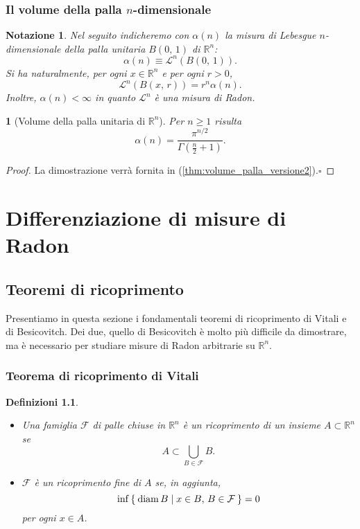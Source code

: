 \documentclass[a4paper,10pt,openright,oneside]{book}
\theoremstyle{theoremstyle}
\theoremstyle{theoremstylewoheader}
\newtheorem{teorema2}[teorema]{}
\theoremstyle{theoremstyle}
\newtheorem{definizioni}[teorema]{Definizioni}
\newtheorem{notazione}[teorema]{Notazione}
\theoremstyle{proofsecstyle}
\theoremstyle{nonumberplain}
\newtheorem{proof}{Dim.}
\newcommand{\FF}{\ensuremath{\mathcal{F}}}
\newcommand{\RR}{\ensuremath{\mathbb{R}}}
\newcommand{\Leb}{\ensuremath{\mathcal{L}}}
\DeclareMathOperator{\diam}{diam}
\renewcommand{\qedsymbol}{\ensuremath{\square}}
\newcommand{\qed}{\unskip\nobreak\hfill\nobreak\hspace{.5em}\qedsymbol}
\begin{document}
\subsection{Il volume della palla $n$-dimensionale}

\begin{notazione}
\label{not:alpha_n}
Nel seguito indicheremo con $\alpha(n)$ la misura di Lebesgue $n$-dimensionale della palla unitaria $B(0,\, 1)$ di $\RR^n$:
\[
\alpha(n) \equiv \Leb^n(B(0,\, 1)).
\]
Si ha naturalmente, per ogni $x \in \RR^n$ e per ogni $r > 0$,
\[
\Leb^n(B(x,\, r)) = r^n\alpha(n).
\]
Inoltre, $\alpha(n) < \infty$ in quanto $\Leb^n$ è una misura di Radon.
\end{notazione}

\begin{teorema2}[Volume della palla unitaria di $\RR^n$]
\label{thm:volume_palla_versione1}
Per $n \ge 1$ risulta
\[
\alpha(n) = \frac{\pi^{n/2}}{\Gamma(\frac{n}{2} + 1)}.
\]
\end{teorema2}

\begin{proof}
La dimostrazione verrà fornita in (\ref{thm:volume_palla_versione2}).\qed
\end{proof}


\chapter{Differenziazione di misure di Radon}

\section{Teoremi di ricoprimento}

Presentiamo in questa sezione i fondamentali teoremi di ricoprimento di Vitali e di Besicovitch. Dei due, quello di Besicovitch è molto più difficile da dimostrare, ma è necessario per studiare misure di Radon arbitrarie su $\RR^n$.

\subsection{Teorema di ricoprimento di Vitali}

\begin{definizioni}
\label{def:ricoprimenti}
\mbox{}
\begin{itemize}
\item[(i)] Una famiglia $\FF$ di palle chiuse in $\RR^n$ è un \emph{ricoprimento} di un insieme $A \subset \RR^n$ se
\[
A \subset \bigcup_{B \in \FF} B.
\]
\item[(ii)] $\FF$ è un \emph{ricoprimento fine} di $A$ se, in aggiunta,
\[
\inf\Set{ \diam B | x \in B,\, B \in \FF } = 0
\]
per ogni $x \in A$.
\end{itemize}
\end{definizioni}
\end{document}
